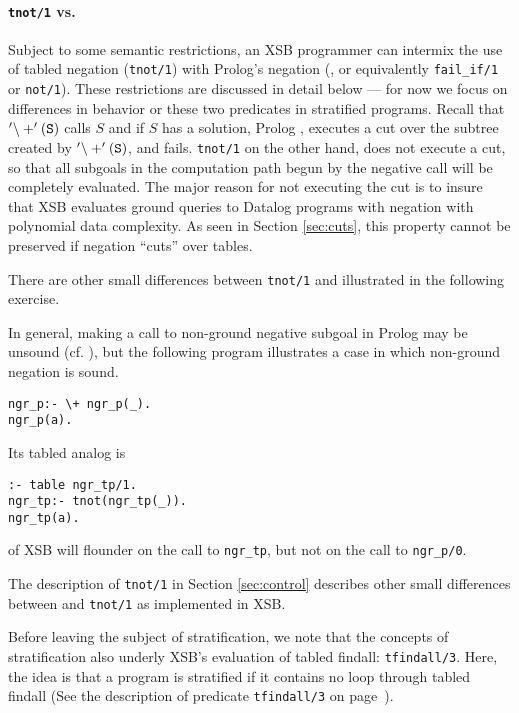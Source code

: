 \paragraph*{{\tt tnot/1} vs. \not }
\index{\not}

Subject to some semantic restrictions, an XSB programmer can intermix
the use of tabled negation ({\tt tnot/1}) with Prolog's negation
(\not, or equivalently {\tt fail\_if/1} or {\tt not/1}).  These
restrictions are discussed in detail below --- for now we focus on
differences in behavior or these two predicates in stratified
programs.  Recall that ${\tt '\backslash+'(S)}$ calls $S$ and if $S$
has a solution, Prolog , executes a cut over the subtree created by
${\tt '\backslash+'(S)}$, and fails.  {\tt tnot/1} on the other hand,
does not execute a cut, so that all subgoals in the computation path
begun by the negative call will be completely evaluated.  The major
reason for not executing the cut is to insure that XSB evaluates
ground queries to Datalog programs with negation with polynomial data
complexity.  As seen in Section \ref{sec:cuts}, this property cannot
be preserved if negation ``cuts'' over tables.

There are other small differences between {\tt tnot/1} and \not
illustrated in the following exercise.

\begin{exercise}
In general, making a call to non-ground negative subgoal in Prolog may
be unsound (cf. \cite{Lloy84}), but the following program illustrates
a case in which non-ground negation is sound.
\begin{verbatim}
ngr_p:- \+ ngr_p(_).
ngr_p(a).
\end{verbatim}
Its tabled analog is 
\begin{verbatim}
:- table ngr_tp/1.
ngr_tp:- tnot(ngr_tp(_)).
ngr_tp(a).
\end{verbatim}
\version{} of XSB will flounder on the call to {\tt ngr\_tp}, but not
on the call to {\tt ngr\_p/0}.  

The description of {\tt tnot/1} in Section \ref{sec:control} describes
other small differences between \not and {\tt tnot/1} as implemented
in XSB.
\end{exercise}

Before leaving the subject of stratification, we note that the
concepts of stratification also underly XSB's evaluation of tabled
findall: {\tt tfindall/3}.  Here, the idea is that a program is
stratified if it contains no loop through tabled findall (See the
description of predicate {\tt tfindall/3} on
page~\pageref{tfindall/3}).

